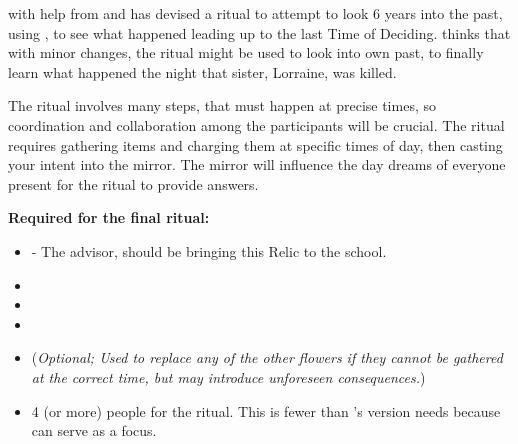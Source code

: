 \documentclass[green]{GL2020}
\begin{document}
\name{\gWhatHappenedToSister{}}

\cHeir{\full} with help from \cPresident{\full} and \cWildCard{\full} has devised a ritual to attempt to look 6 years into the past, using \iMirror{},  to see what happened leading up to the last Time of Deciding. \cWildCard{} thinks that with minor changes, the ritual might be used to look into \cWildCard{\their} own past, to finally learn what happened the night that \cWildCard{\their} sister, Lorraine, was killed.

The ritual involves many steps, that must happen at precise times, so coordination and collaboration among the participants will be crucial. The ritual requires gathering items and charging them at specific times of day, then casting your intent into the mirror. The mirror will influence the day dreams of everyone present for the ritual to provide answers.

\textbf{Required for the final ritual:}
\begin{itemize}
  \item \iMirror{} - The \pTech{} advisor, \cDiplomat{\full} should be bringing this Relic to the school.
  \item \iMorningGlory{}
  \item \iLily{}
  \item \iMoonflower{}
  \item \iStoneFlower{} (\emph{Optional; Used to replace any of the other flowers if they cannot be gathered at the correct time, but may introduce unforeseen consequences.})
  \item 4 (or more) people for the ritual. This is fewer than \cHeir{}'s version needs because \cWildCard{} can serve as a focus.
\end{itemize}
\end{document}
